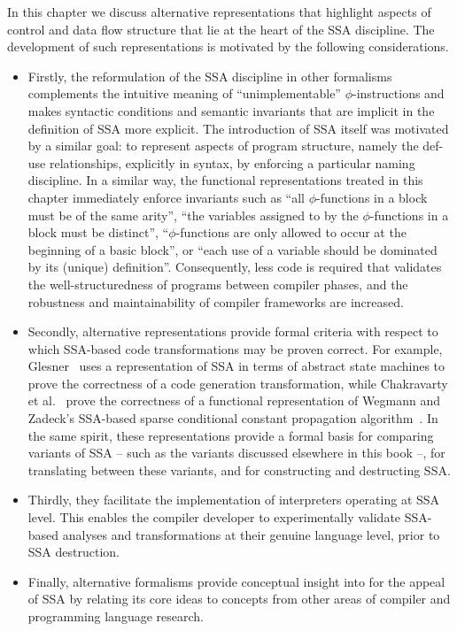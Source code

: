 \label{section:Part1:Semantics:Intro}
In this chapter we discuss alternative representations that highlight
aspects of control and data flow structure that lie at the heart of
the SSA discipline.  The development of such representations is
motivated by the following considerations.
\begin{itemize}
\item 
Firstly, the reformulation of the SSA discipline in other formalisms
complements the intuitive meaning of ``unimplementable''
$\phi$-instructions and makes syntactic conditions and semantic
invariants that are implicit in the definition of SSA more
explicit. The introduction of SSA itself was motivated by a similar
goal: to represent aspects of program structure, namely the def-use
relationships, explicitly in syntax, by enforcing a particular naming
discipline. In a similar way, the functional representations treated
in this chapter immediately enforce invariants such as ``all
$\phi$-functions in a block must be of the same arity'', ``the
variables assigned to by the $\phi$-functions in a block must be
distinct'', ``$\phi$-functions are only allowed to occur at the
beginning of a basic block'', or ``each use of a variable should be
dominated by its (unique) definition''. Consequently, less code is
required that validates the well-structuredness of programs between
compiler phases, and the robustness and maintainability of compiler
frameworks are increased.

\item
Secondly, alternative representations provide formal criteria with
respect to which SSA-based code transformations may be proven
correct. For example, Glesner~\cite{DBLP:conf/asm/Glesner04} uses a
representation of SSA in terms of abstract state machines to prove the
correctness of a code generation transformation, while Chakravarty et
al.~\cite{ChakravartyKZ:COCV03} prove the correctness of a functional
representation of Wegmann and Zadeck's SSA-based sparse conditional
constant propagation algorithm~\cite{WegmannZ:Toplas1991}. In the same
spirit, these representations provide a formal basis for comparing
variants of SSA -- such as the variants discussed elsewhere in this
book --, for translating between these variants, and for constructing
and destructing SSA.

\item
Thirdly, they facilitate the implementation of interpreters operating
at SSA level. This enables the compiler developer to experimentally
validate SSA-based analyses and transformations at their genuine
language level, prior to SSA destruction.

\item
Finally, alternative formalisms provide conceptual insight into for
the appeal of SSA by relating its core ideas to concepts from other
areas of compiler and programming language research.
\end{itemize}
